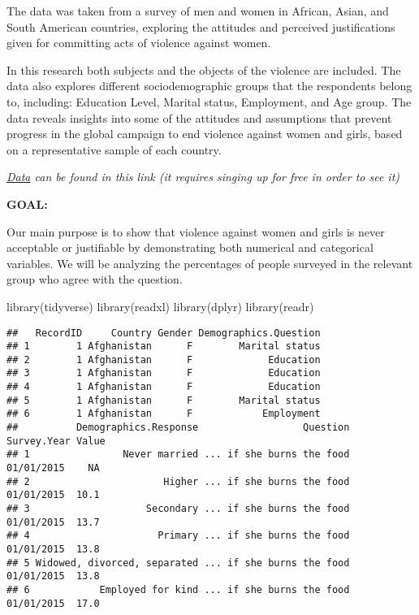\documentclass[
]{article}
\newenvironment{Shaded}{\begin{snugshade}}{\end{snugshade}}
\newcommand{\FunctionTok}[1]{\textcolor[rgb]{0.00,0.00,0.00}{#1}}
\newcommand{\NormalTok}[1]{#1}
\begin{document}
The data was taken from a survey of men and women in African, Asian, and
South American countries, exploring the attitudes and perceived
justifications given for committing acts of violence against women.

In this research both subjects and the objects of the violence are
included. The data also explores different sociodemographic groups that
the respondents belong to, including: Education Level, Marital status,
Employment, and Age group. The data reveals insights into some of the
attitudes and assumptions that prevent progress in the global campaign
to end violence against women and girls, based on a representative
sample of each country.

\emph{\href{https://data.world/login?next=\%2Fmakeovermonday\%2F2020w10\%2Fworkspace\%2Ffile\%3Ffilename\%3D20200306\%2BData\%2BInternational\%2BWomen\%2527s\%2BDay\%2BViz5\%2BLaunch.csv}{Data}
can be found in this link (it requires singing up for free in order to
see it)}

\textbf{GOAL:}

Our main purpose is to show that violence against women and girls is
never acceptable or justifiable by demonstrating both numerical and
categorical variables. We will be analyzing the percentages of people
surveyed in the relevant group who agree with the question.

\newpage

\begin{Shaded}
\begin{Highlighting}[]
\FunctionTok{library}\NormalTok{(tidyverse)}
\FunctionTok{library}\NormalTok{(readxl)}
\FunctionTok{library}\NormalTok{(dplyr)}
\FunctionTok{library}\NormalTok{(readr)}
\end{Highlighting}
\end{Shaded}

\begin{verbatim}
##   RecordID     Country Gender Demographics.Question
## 1        1 Afghanistan      F        Marital status
## 2        1 Afghanistan      F             Education
## 3        1 Afghanistan      F             Education
## 4        1 Afghanistan      F             Education
## 5        1 Afghanistan      F        Marital status
## 6        1 Afghanistan      F            Employment
##          Demographics.Response                  Question Survey.Year Value
## 1                Never married ... if she burns the food  01/01/2015    NA
## 2                       Higher ... if she burns the food  01/01/2015  10.1
## 3                    Secondary ... if she burns the food  01/01/2015  13.7
## 4                      Primary ... if she burns the food  01/01/2015  13.8
## 5 Widowed, divorced, separated ... if she burns the food  01/01/2015  13.8
## 6            Employed for kind ... if she burns the food  01/01/2015  17.0
\end{verbatim}
\end{document}
